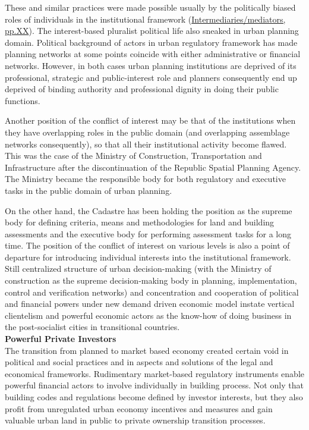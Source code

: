 \documentclass[11pt]{report}
\begin{document}
These and similar practices were made possible usually by the politically biased roles of individuals in the institutional framework (\href{ref}{Intermediaries/mediators, pp.XX}).
The interest-based pluralist political life also sneaked in urban planning domain.
Political background of actors in urban regulatory framework has made planning networks at some points coincide with either administrative or financial networks.
However, in both cases urban planning institutions are deprived of its professional, strategic and public-interest role and planners consequently end up deprived of binding authority and professional dignity in doing their public functions.

Another position of the conflict of interest may be that of the institutions when they have overlapping roles in the public domain (and overlapping assemblage networks consequently), so that all their institutional activity become flawed.
This was the case of the Ministry of Construction, Transportation and Infrastructure after the discontinuation of the Republic Spatial Planning Agency. The Ministry became the responsible body for both regulatory and executive tasks in the public domain of urban planning.

On the other hand, the Cadastre has been holding the position  as the supreme body for defining criteria, means and methodologies for land and building assessments and the executive body for performing assessment tasks for a long time.
The position of the conflict of interest on various levels is also a point of departure for introducing individual interests into the institutional framework. Still centralized structure of urban decision-making (with the Ministry of construction as the supreme decision-making body in planning, implementation, control and verification networks) and concentration and cooperation of political and financial powers under new demand driven economic model instate vertical clientelism and powerful economic actors as the know-how of doing business in the post-socialist cities in transitional countries.
\\

\textbf{Powerful Private Investors}
\\
The transition from planned to market based economy created certain void in political and social practices and in aspects and solutions of the legal and economical frameworks.
Rudimentary market-based regulatory instruments enable powerful financial actors to involve individually in building process.
Not only that building codes and regulations become defined by investor interests, but they also profit from unregulated urban economy incentives and measures and gain valuable urban land in public to private ownership transition processes.
\end{document}

